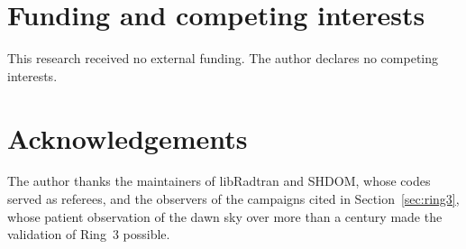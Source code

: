 \documentclass[preprint,12pt]{elsarticle}
\begin{document}
\section*{Funding and competing interests}

This research received no external funding. The author declares no
competing interests.

\section*{Acknowledgements}

The author thanks the maintainers of libRadtran and SHDOM, whose codes
served as referees, and the observers of the campaigns cited in
Section~\ref{sec:ring3}, whose patient observation of the dawn sky over
more than a century made the validation of Ring~3 possible.
\end{document}
